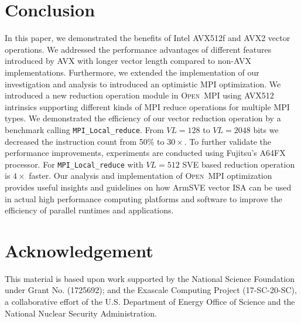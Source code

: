 \documentclass[sigconf]{acmart}
\newcommand{\mpifunc}[1]{\lstinline"MPI_#1"\xspace}
\newcommand{\ompi}[0]{\textsc{Open~MPI}\xspace}
\newcommand{\mpi}[0]{\textsc{MPI}\xspace}
\newcommand{\arm}[0]{Arm\xspace}
\newcommand{\sve}[0]{\textsc{SVE}\xspace}
\begin{document}
\section{Conclusion}\label{sec:conclusion}
In this paper, we demonstrated the benefits of Intel AVX512f and AVX2 vector operations. We
addressed the performance advantages of different features introduced by AVX
with longer vector length compared to non-AVX implementations. Furthermore,
we extended the implementation of our investigation and analysis to introduced
an optimistic \mpi optimization.
%
We introduced
a new reduction operation module in \ompi using AVX512 intrinsics supporting
different kinds of \mpi reduce operations for multiple \mpi types. We
demonstrated the efficiency of our vector reduction operation by a benchmark
calling \mpifunc{Local_reduce}. From $VL=128$ to $VL=2048$ bits we decreased the
instruction count from 50\% to $30 \times$. To further validate the performance improvements,
experiments are conducted using Fujitsu's A64FX processor. For \mpifunc{Local_reduce} with $VL=512$
SVE based reduction operation is $4 \times$ faster.
Our analysis and implementation of
\ompi optimization provides useful insights and guidelines on how \arm \sve
vector ISA can be used in actual high performance computing platforms and
software to improve the efficiency of parallel runtimes and applications.

\section*{Acknowledgement}
%
This material is based upon work supported by the National Science Foundation under Grant No. (1725692); and the Exascale Computing Project (17-SC-20-SC), a collaborative effort of the
U.S. Department of Energy Office of Science and the National Nuclear Security Administration.

%
%


\end{document}
